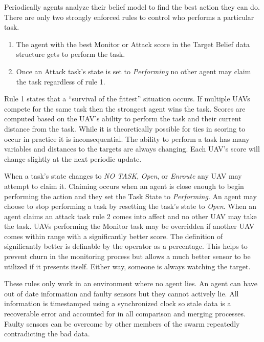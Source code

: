 Periodically agents analyze their belief model to find the best action they can do.  There are only two strongly enforced rules to control who performs a particular task.  

\begin{enumerate}
	\item The agent with the best Monitor or Attack score in the Target Belief data structure gets to perform the task.
	\item Once an Attack task's state is set to \textit{Performing} no other agent may claim the task regardless of rule 1.
\end{enumerate}

Rule 1 states that a ``survival of the fittest'' situation occurs.  If multiple UAVs compete for the same task then the strongest agent wins the task.  Scores are computed based on the UAV's ability to perform the task and their current distance from the task.  While it is theoretically possible for ties in scoring to occur in practice it is inconsequential.  The ability to perform a task has many variables and distances to the targets are always changing.  Each UAV's score will change slightly at the next periodic update.

When a task's state changes to \textit{NO TASK}, \textit{Open}, or \textit{Enroute} any UAV may attempt to claim it.  Claiming occurs when an agent is close enough to begin performing the action and they set the Task State to \textit{Performing}.  An agent may choose to stop performing a task by resetting the task's state to \textit{Open}.  When an agent claims an attack task rule 2 comes into affect and no other UAV may take the task.  UAVs performing the Monitor task may be overridden if another UAV comes within range with a significantly better score.  The definition of significantly better is definable by the operator as a percentage.   This helps to prevent churn in the monitoring process but allows a much better sensor to be utilized if it presents itself.  Either way, someone is always watching the target.

These rules only work in an environment where no agent lies.  An agent can have out of date information and faulty sensors but they cannot actively lie.  All information is timestamped using a synchronized clock so stale data is a recoverable error and accounted for in all comparison and merging processes.  Faulty sensors can be overcome by other members of the swarm repeatedly contradicting the bad data.

